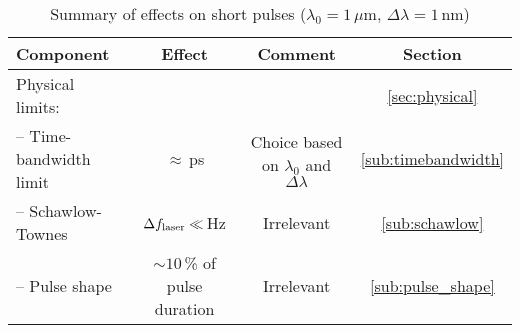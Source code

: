 \documentclass[twocolumn,tighten,longauthor]{myaastex62}
\begin{document}
\begin{table*}
\center
\caption{Summary of effects on short pulses ($\lambda_0=1\,\mu$m, $\Delta \lambda = 1\,$nm)}
\label{tab:summary}
\begin{tabular}{lccc}
\hline
Component & Effect & Comment & Section \\
\toprule
Physical limits: & & & \ref{sec:physical} \\
-- Time-bandwidth limit & $\approx\,$ps & Choice based on $\lambda_0$ and $\Delta \lambda$ & \ref{sub:timebandwidth} \\
-- Schawlow-Townes & $\Delta f_{\rm laser} \ll \,$Hz & Irrelevant & \ref{sub:schawlow} \\
-- Pulse shape & $\sim10\,$\% of pulse duration & Irrelevant & \ref{sub:pulse_shape} \\


\end{tabular}
\end{table*}
\end{document}

